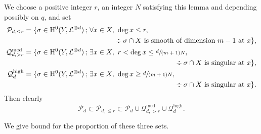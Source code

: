 \documentclass[JEP,XML,SOM,Unicode,published]{cedram}
\newcommand{\sep}{\,;\,}
\theoremstyle{plain}
\theoremstyle{definition}
\newcommand{\ho}{\mathrm{H}}
\newcommand{\li}{\mathcal{L}}
\begin{document}
We choose a positive integer $r$, an integer $N$ satisfying this lemma and depending possibly on $q$, and set
\begin{align*}
\mathcal{P}_{d,\leq r}&=\{ \sigma\in \ho^0(Y,\li^{\otimes d})\sep \forall x\in X,\ \deg x\leq r,\\
&\hspace*{4.5cm} \div \sigma\cap X \text{ is smooth of dimension } m-1 \text{ at }x \}, \\
\mathcal{Q}_{d, >r}^{\mathrm{med}} &= \{ \sigma\in \ho^0(Y,\li^{\otimes d})\sep \exists x\in X,\ r<\deg x\leq \sfrac{d}{(m+1)N},\\ &\hspace*{7.5cm}\div \sigma\cap X \text{ is singular at }x \}, \\
\mathcal{Q}_{d}^{\mathrm{high}}&= \{ \sigma\in \ho^0(Y,\li^{\otimes d})\sep \exists x\in X,\ \deg x\geq \sfrac{d}{(m+1)N},\\
&\hspace*{7.5cm}\div \sigma\cap X \text{ is singular at }x \}.
\end{align*}
Then clearly
\[
\mathcal{P}_{d}\subset\mathcal{P}_{d,\leq r}\subset \mathcal{P}_{d}\cup \mathcal{Q}_{d, >r}^{\mathrm{med}}\cup \mathcal{Q}_{d}^{\mathrm{high}}.
\]

We give bound for the proportion of these three sets.

\end{document}

